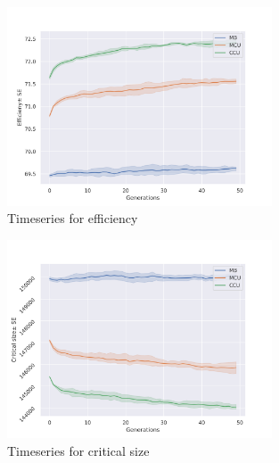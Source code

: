\begin{figure}[p]
  \centering
  \includegraphics[trim = 0 0 50 50, clip, width=0.7\textwidth]{C4/Figs/eff}
  \caption{Timeseries for efficiency}
  \label{eff}
\end{figure}
\begin{figure}[p]
  \centering
  \includegraphics[trim = 0 0 50 50, clip, width=0.7\textwidth]{C4/Figs/mc}
  \caption{Timeseries for critical size}
  \label{mc}
\end{figure}

\newpage
